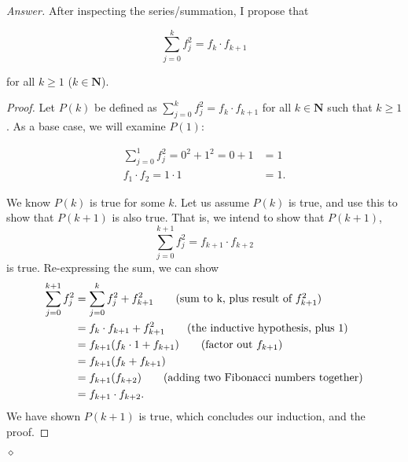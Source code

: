 \documentclass[12pt,oneside]{amsart}
\theoremstyle{remark}
\newcommand{\bfN}{\mathbf{N}}
\newenvironment{answer}{\bigskip\noindent\emph{Answer.}}{\hfill$\diamond$\newline}
\begin{document}
\begin{answer}
After inspecting the series/summation, I propose that

$$
\sum_{j = 0}^{k} f^2_j = f_k \cdot f_{k + 1}
$$

for all $k \geq 1$ ($k \in \bfN$).

\begin{proof}
Let $P(k)$ be defined as $\sum_{j = 0}^{k} f^2_j = f_k \cdot f_{k + 1}$ for all $k \in \bfN$ such that $k \geq 1$. As a base case, we will examine $P(1)$:

\begin{align*}
\sum_{j = 0}^1 f^2_j = 0^2 + 1^2 = 0 + 1 &= 1 \\
f_1 \cdot f_{2} = 1 \cdot 1 &= 1.
\end{align*}

We know $P(k)$ is true for some $k$. Let us assume $P(k)$ is true, and use this to show that $P(k + 1)$ is also true. That is, we intend to show that $P(k + 1)$,
$$
\sum_{j = 0}^{k + 1} f^2_j = f_{k + 1} \cdot f_{k + 2}
$$ is true. Re-expressing the sum, we can show
\begin{align*}
\sum_{j = 0}^{k + 1} f^2_j &= \sum_{j = 0}^{k} f^2_j + f^2_{k + 1} \tag{sum to k, plus result of $f^2_{k + 1}$} \\
                           &= f_k \cdot f_{k + 1} + f^2_{k + 1} \tag{the inductive hypothesis, plus 1} \\
                           &= f_{k + 1} (f_k \cdot 1 + f_{k + 1}) \tag{factor out $f_{k + 1}$} \\
                           &= f_{k + 1} (f_k + f_{k + 1}) \\
                           &= f_{k + 1} (f_{k + 2}) \tag{adding two Fibonacci numbers together} \\
                           &= f_{k + 1} \cdot f_{k + 2}.
\end{align*} We have shown $P(k + 1)$ is true, which concludes our induction, and the proof.
\end{proof}

\end{answer}
\end{document}
